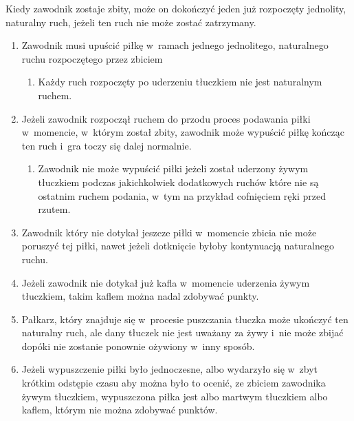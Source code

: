 \documentclass[12pt,a4paper]{article}
\renewcommand{\paragraph}[1]{
  \oldparagraph{#1}%
  \leftskip2cm
}
\begin{document}
Kiedy zawodnik zostaje zbity, może on dokończyć jeden już rozpoczęty
jednolity, naturalny ruch, jeżeli ten ruch nie może zostać zatrzymany.

\paragraph{Stosuje się następujące warunki:}

\begin{enumerate}
	\item
	      Zawodnik musi upuścić piłkę w~ramach jednego jednolitego, naturalnego
	      ruchu rozpoczętego przez zbiciem

	      \begin{enumerate}
		      \item
		            Każdy ruch rozpoczęty po uderzeniu tłuczkiem nie jest naturalnym
		            ruchem.
	      \end{enumerate}
	\item
	      Jeżeli zawodnik rozpoczął ruchem do przodu proces podawania piłki w~momencie, w~którym został zbity, zawodnik może wypuścić piłkę kończąc
	      ten ruch i~gra toczy się dalej normalnie.

	      \begin{enumerate}
		      \item
		            Zawodnik nie może wypuścić piłki jeżeli został uderzony żywym tłuczkiem
		            podczas jakichkolwiek dodatkowych ruchów które nie są ostatnim
		            ruchem podania, w~tym na przykład cofnięciem ręki przed rzutem.
	      \end{enumerate}
	\item
	      Zawodnik który nie dotykał jeszcze piłki w~momencie zbicia nie może
	      poruszyć tej piłki, nawet jeżeli dotknięcie byłoby kontynuacją
	      naturalnego ruchu.
	\item
	      Jeżeli zawodnik nie dotykał już kafla w~momencie uderzenia żywym
	      tłuczkiem, takim kaflem można nadal zdobywać punkty.
	\item
	      Pałkarz, który znajduje się w~procesie puszczania tłuczka może
	      ukończyć ten naturalny ruch, ale dany tłuczek nie jest uważany za żywy
	      i~nie może zbijać dopóki nie zostanie ponownie ożywiony w~inny sposób.
	\item
	      Jeżeli wypuszczenie piłki było jednoczesne, albo wydarzyło się w~zbyt
	      krótkim odstępie czasu aby można było to ocenić, ze zbiciem zawodnika
	      żywym tłuczkiem, wypuszczona piłka jest albo martwym tłuczkiem albo
	      kaflem, którym nie można zdobywać punktów.
\end{enumerate}
\end{document}
